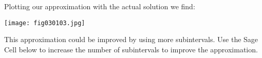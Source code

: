 \documentclass{ximera}
\begin{document}
\begin{example}
Plotting our approximation with the actual solution we find:

\begin{image}
 \texttt{[image: fig030103.jpg]} 
\end{image}

 
 
This approximation could be improved by using more subintervals.  Use the Sage Cell below to increase the number of subintervals to improve the approximation.
 


\end{example}
\end{document}
